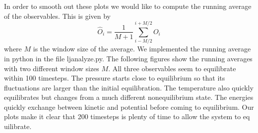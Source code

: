In order to smooth out these plots we would like to compute the running average of the observables. This is given by
\begin{equation}
\hat{O}_i = \frac{1}{M+1} \sum_{i - M/2}^{i+M/2} O_i
\end{equation}
where $M$ is the window size of the average. We implemented the running average in python in the file ljanalyze.py.
The following figures show the running averages with two different window sizes $M$. All three observables seem to equilibrate within 100 timesteps. The pressure starts close to equilibrium so that its fluctuations are larger than the initial equilibration. The temperature also quickly equilibrates but changes from a much different nonequilibrium state. The energies quickly exchange between kinetic and potential before coming to equilibrium. Our plots make it clear that 200 timesteps is plenty of time to allow the system to eq	uilibrate.
